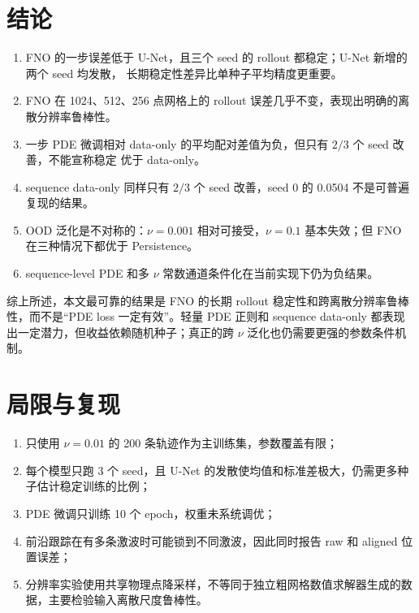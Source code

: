 \documentclass[a4paper,11pt,fontset=windows]{ctexart}
\begin{document}
\section{结论}

\begin{enumerate}
  \item FNO 的一步误差低于 U-Net，且三个 seed 的 rollout 都稳定；U-Net 新增的两个 seed 均发散，
  长期稳定性差异比单种子平均精度更重要。
  \item FNO 在 1024、512、256 点网格上的 rollout 误差几乎不变，表现出明确的离散分辨率鲁棒性。
  \item 一步 PDE 微调相对 data-only 的平均配对差值为负，但只有 $2/3$ 个 seed 改善，不能宣称稳定
  优于 data-only。
  \item sequence data-only 同样只有 $2/3$ 个 seed 改善，seed 0 的 0.0504 不是可普遍复现的结果。
  \item OOD 泛化是不对称的：$\nu=0.001$ 相对可接受，$\nu=0.1$ 基本失效；但 FNO 在三种情况下都优于
  Persistence。
  \item sequence-level PDE 和多 $\nu$ 常数通道条件化在当前实现下仍为负结果。
\end{enumerate}

综上所述，本文最可靠的结果是 FNO 的长期 rollout 稳定性和跨离散分辨率鲁棒性，而不是“PDE loss
一定有效”。轻量 PDE 正则和 sequence data-only 都表现出一定潜力，但收益依赖随机种子；真正的跨
$\nu$ 泛化也仍需要更强的参数条件机制。

\section{局限与复现}

\begin{enumerate}
  \item 只使用 $\nu=0.01$ 的 200 条轨迹作为主训练集，参数覆盖有限；
  \item 每个模型只跑 3 个 seed，且 U-Net 的发散使均值和标准差极大，仍需更多种子估计稳定训练的比例；
  \item PDE 微调只训练 10 个 epoch，权重未系统调优；
  \item 前沿跟踪在有多条激波时可能锁到不同激波，因此同时报告 raw 和 aligned 位置误差；
  \item 分辨率实验使用共享物理点降采样，不等同于独立粗网格数值求解器生成的数据，主要检验输入离散尺度鲁棒性。
\end{enumerate}
\end{document}
